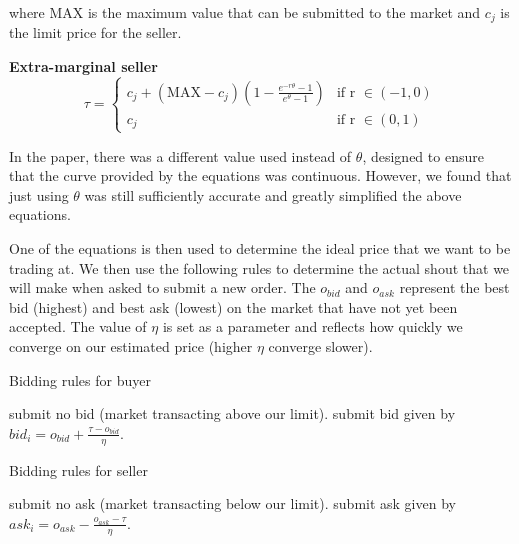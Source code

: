 \documentclass[preprint]{acm_proc_article-sp} %
\begin{document}
where MAX is the maximum value that can be submitted to the market and $c_j$ is
the limit price for the seller.

\textbf{Extra-marginal seller}
\begin{equation}
    \label{eqn:extraseller}
    \tau =
    \begin{cases}
        c_j + (\text{MAX}-c_j)(1-\frac{e^{-r\theta}-1}{e^\theta-1}) &  \text{if r } \in (-1,0)  \\
        c_j & \text{if r } \in (0,1)
    \end{cases}
\end{equation}

In the paper, there was a different value used instead of $\theta$, designed to
ensure that the curve provided by the equations was continuous. However, we
found that just using $\theta$ was still sufficiently accurate and greatly
simplified the above equations.

One of the equations is then used to determine the ideal price that we want to
be trading at. We then use the following rules to determine the actual shout
that we will make when asked to submit a new order. The $o_{bid}$ and $o_{ask}$
represent the best bid (highest) and best ask (lowest) on the market that have
not yet been accepted. The value of $\eta$ is set as a parameter and reflects
how quickly we converge on our estimated price (higher $\eta$ converge slower).

\begin{algorithm}[H]
    \label{alg:bidding_rules_buyer}
    \caption{Bidding rules for buyer}
    \begin{algorithmic}
            \STATE submit no bid (market transacting above our limit).
        \ELSE
            \STATE submit bid given by $bid_i = \textstyle o_{bid} + \frac{\textstyle \tau - o_{bid}}{\textstyle \eta}$.
        \ENDIF
    \end{algorithmic}
\end{algorithm}

\begin{algorithm}[H]
    \label{alg:bidding_rules_seller}
    \caption{Bidding rules for seller}
    \begin{algorithmic}
            \STATE submit no ask (market transacting below our limit).
        \ELSE
            \STATE submit ask given by $ask_i = \textstyle o_{ask} - \frac{\textstyle o_{ask}-\tau}{\textstyle \eta}$.
        \ENDIF
    \end{algorithmic}
\end{algorithm}
\end{document}
